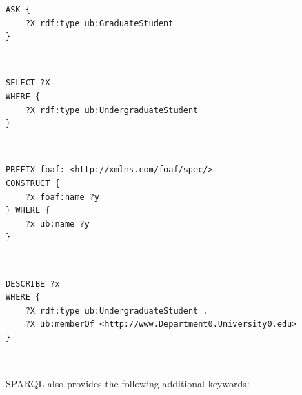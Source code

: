 \documentclass[10pt, a4paper]{report}
\begin{document}
\begin{enumerate}
	\begin{minipage}{0.92\textwidth}
		\item
		\lstset{language=sql}
		\begin{lstlisting}
ASK {
    ?X rdf:type ub:GraduateStudent
}
                    \end{lstlisting}
	\end{minipage} \\
	\begin{minipage}{0.92\textwidth}
		\item
		\lstset{language=sql}
		\begin{lstlisting}
SELECT ?X
WHERE {
    ?X rdf:type ub:UndergraduateStudent
}
                    \end{lstlisting}
	\end{minipage} \\
	\begin{minipage}{0.92\textwidth}
		\item
		\lstset{language=sql}
		\begin{lstlisting}
PREFIX foaf: <http://xmlns.com/foaf/spec/>
CONSTRUCT {
    ?x foaf:name ?y
} WHERE { 
    ?x ub:name ?y
}
                    \end{lstlisting}
	\end{minipage} \\
	\begin{minipage}{0.92\textwidth}
		\item
		\lstset{language=sql}
		\begin{lstlisting}
DESCRIBE ?x
WHERE {
    ?X rdf:type ub:UndergraduateStudent .
    ?X ub:memberOf <http://www.Department0.University0.edu>
}
                    \end{lstlisting}
	\end{minipage} \\
\end{enumerate}

SPARQL also provides the following additional keywords: \\
\end{document}
